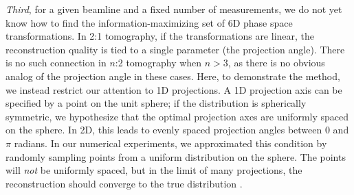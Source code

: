 \documentclass[%
    reprint,
    twocolumn,
    nofootinbib,
    amsmath,
    amssymb,
    aps,
    prstab,
]{revtex4-2}
\begin{document}
\textit{Third}, for a given beamline and a fixed number of measurements, we do not yet know how to find the information-maximizing set of 6D phase space transformations. In 2:1 tomography, if the transformations are linear, the reconstruction quality is tied to a single parameter (the projection angle). There is no such connection in $n$:2 tomography when $n > 3$, as there is no obvious analog of the projection angle in these cases. Here, to demonstrate the method, we instead restrict our attention to 1D projections. A 1D projection axis can be specified by a point on the unit sphere; if the distribution is spherically symmetric, we hypothesize that the optimal projection axes are uniformly spaced on the sphere. In 2D, this leads to evenly spaced projection angles between $0$ and $\pi$ radians. In our numerical experiments, we approximated this condition by randomly sampling points from a uniform distribution on the sphere. The points will \textit{not} be uniformly spaced, but in the limit of many projections, the reconstruction should converge to the true distribution \cite{Dai_2021_sinf}.
\end{document}
